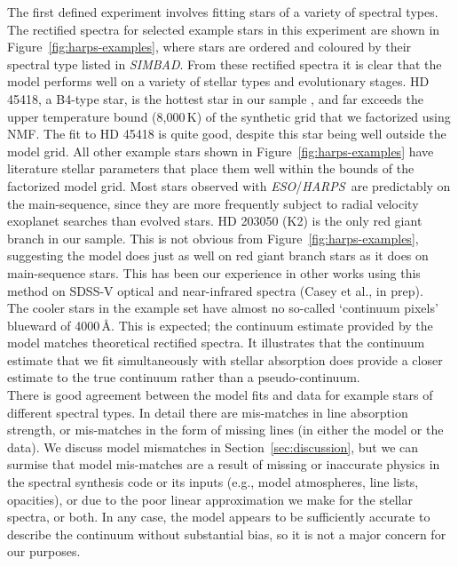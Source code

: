 \documentclass[modern]{aastex631}
\newcommand{\project}[1]{\textit{#1}}
\newcommand{\eso}{\project{ESO}}
\newcommand{\harps}{\project{HARPS}}
\begin{document}
The first defined experiment involves fitting stars of a variety of spectral types. The rectified spectra for selected example stars in this experiment are shown in Figure~\ref{fig:harps-examples}, where stars are ordered and coloured by their spectral type listed in \project{SIMBAD}. From these rectified spectra it is clear that the model performs well on a variety of stellar types and evolutionary stages. HD 45418, a B4-type star, is the hottest star in our sample  \citep[$T_\mathrm{eff} = 16{,}750\,K$ according to ][]{2015MNRAS.454...28M}, and far exceeds the upper temperature bound (8,000\,K) of the synthetic grid that we factorized using NMF. The fit to HD 45418 is quite good, despite this star being well outside the model grid. All other example stars shown in Figure~\ref{fig:harps-examples} have literature stellar parameters that place them well within the bounds of the factorized model grid. Most stars observed with \eso/\harps\ are predictably on the main-sequence, since they are more frequently subject to radial velocity exoplanet searches than evolved stars. HD 203050 (K2) is the only red giant branch in our sample. This is not obvious from Figure~\ref{fig:harps-examples}, suggesting the model does just as well on red giant branch stars as it does on main-sequence stars. This has been our experience in other works using this method on SDSS-V optical and near-infrared spectra (Casey et al., in prep).\\


The cooler stars in the example set have almost no so-called `continuum pixels' blueward of 4000\,\AA. This is expected; the continuum estimate provided by the model matches theoretical rectified spectra. It illustrates that the continuum estimate that we fit simultaneously with stellar absorption does provide a closer estimate to the true continuum rather than a pseudo-continuum.\\

There is good agreement between the model fits and data for example stars of different spectral types. In detail there are mis-matches in line absorption strength, or mis-matches in the form of missing lines (in either the model or the data). We discuss model mismatches in Section~\ref{sec:discussion}, but we can surmise that model mis-matches are a result of missing or inaccurate physics in the spectral synthesis code or its inputs (e.g., model atmospheres, line lists, opacities), or due to the poor linear approximation we make for the stellar spectra, or both. In any case, the model appears to be sufficiently accurate to describe the continuum without substantial bias, so it is not a major concern for our purposes.\\
\end{document}
